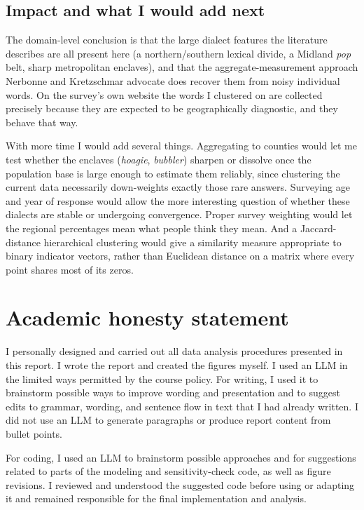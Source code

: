 \documentclass[10pt,letterpaper]{article}
\begin{document}
\subsection{Impact and what I would add next}

The domain-level conclusion is that the large dialect features the literature
describes are all present here (a northern/southern lexical divide, a
Midland \emph{pop} belt, sharp metropolitan enclaves), and that the
aggregate-measurement approach Nerbonne and Kretzschmar advocate does recover
them from noisy individual words. On the survey's own website the words I
clustered on are collected precisely because they are expected to be
geographically diagnostic, and they behave that way.

With more time I would add several things. Aggregating to counties would let me
test whether the enclaves (\emph{hoagie}, \emph{bubbler}) sharpen or dissolve
once the population base is large enough to estimate them reliably, since
clustering the current data necessarily down-weights exactly those rare
answers. Surveying age and year of response would allow the more interesting
question of whether these dialects are stable or undergoing convergence.
Proper survey weighting would let the regional percentages mean what people
think they mean. And a Jaccard-distance hierarchical clustering would give a
similarity measure appropriate to binary indicator vectors, rather than
Euclidean distance on a matrix where every point shares most of its zeros.

\section{Academic honesty statement}\label{academic-honesty-statement}

I personally designed and carried out all data analysis procedures presented in this report. I wrote the report and created the figures myself. I used an LLM in the limited ways permitted by the course policy. For writing, I used it to brainstorm possible ways to improve wording and presentation and to suggest edits to grammar, wording, and sentence flow in text that I had already written. I did not use an LLM to generate paragraphs or produce report content from bullet points.

For coding, I used an LLM to brainstorm possible approaches and for suggestions related to parts of the modeling and sensitivity-check code, as well as figure revisions. I reviewed and understood the suggested code before using or adapting it and remained responsible for the final implementation and analysis.
\end{document}
